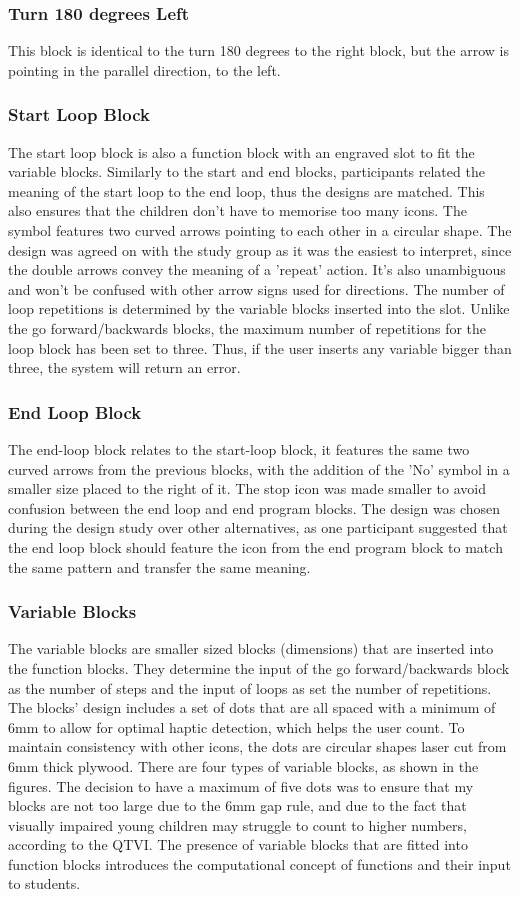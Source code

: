 \documentclass[oneside,%
                    author={Malak Hajji},
                    degree={BSc},
                    title={Designing An Accessible Computational Toolkit For Students},
                  subtitle={With Mixed Visual Abilities}]{dissertation}
\begin{document}
\subsubsection{Turn 180 degrees Left}
This block is identical to the turn 180 degrees to the right block, but the arrow is pointing in the parallel direction, to the left.
\subsubsection{Start Loop Block}
The start loop block is also a function block with an engraved slot to fit the variable blocks. Similarly to the start and end blocks, participants related the meaning of the start loop to the end loop, thus the designs are matched. This also ensures that the children don't have to memorise too many icons. The symbol features two curved arrows pointing to each other in a circular shape. The design was agreed on with the study group as it was the easiest to interpret, since the double arrows convey the meaning of a 'repeat' action. It's also unambiguous and won't be confused with other arrow signs used for directions. The number of loop repetitions is determined by the variable blocks inserted into the slot. Unlike the go forward/backwards blocks, the maximum number of repetitions for the loop block has been set to three. Thus, if the user inserts any variable bigger than three, the system will return an error.
\subsubsection{End Loop Block}
The end-loop block relates to the start-loop block, it features the same two curved arrows from the previous blocks, with the addition of the 'No' symbol in a smaller size placed to the right of it. The stop icon was made smaller to avoid confusion between the end loop and end program blocks. The design was chosen during the design study over other alternatives, as one participant suggested that the end loop block should feature the icon from the end program block to match the same pattern and transfer the same meaning. 
\subsubsection{Variable Blocks}
The variable blocks are smaller sized blocks (dimensions) that are inserted into the function blocks. They determine the input of the go forward/backwards block as the number of steps and the input of loops as set the number of repetitions. The blocks' design includes a set of dots that are all spaced with a minimum of 6mm to allow for optimal haptic detection, which helps the user count. To maintain consistency with other icons, the dots are circular shapes laser cut from 6mm thick plywood. There are four types of variable blocks, as shown in the figures. The decision to have a maximum of five dots was to ensure that my blocks are not too large due to the 6mm gap rule, and due to the fact that visually impaired young children may struggle to count to higher numbers, according to the QTVI. The presence of variable blocks that are fitted into function blocks introduces the computational concept of functions and their input to students. 
\end{document}
